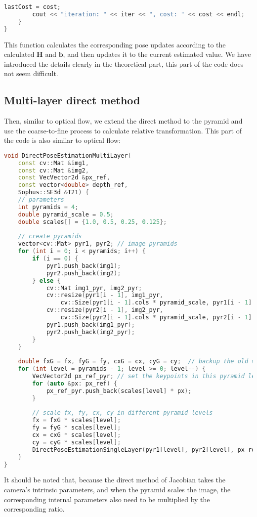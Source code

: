 {\begin{lstlisting}[language=c++,caption=slambook2/ch8/direct_method.cpp (snippet)]
		lastCost = cost;
		cout << "iteration: " << iter << ", cost: " << cost << endl;
	}
}
\end{lstlisting}
This function calculates the corresponding pose updates according to the calculated $\bm{H}$ and $\bm{b}$, and then updates it to the current estimated value. We have introduced the details clearly in the theoretical part, this part of the code does not seem difficult.

\subsection{Multi-layer direct method}
Then, similar to optical flow, we extend the direct method to the pyramid and use the coarse-to-fine process to calculate relative transformation. This part of the code is also similar to optical flow:
\begin{lstlisting}[language=c++,caption=slambook2/ch8/direct_method.cpp (snippet)]
void DirectPoseEstimationMultiLayer(
	const cv::Mat &img1,
	const cv::Mat &img2,
	const VecVector2d &px_ref,
	const vector<double> depth_ref,
	Sophus::SE3d &T21) {
	// parameters
	int pyramids = 4;
	double pyramid_scale = 0.5;
	double scales[] = {1.0, 0.5, 0.25, 0.125};
	
	// create pyramids
	vector<cv::Mat> pyr1, pyr2; // image pyramids
	for (int i = 0; i < pyramids; i++) {
		if (i == 0) {
			pyr1.push_back(img1);
			pyr2.push_back(img2);
		} else {
			cv::Mat img1_pyr, img2_pyr;
			cv::resize(pyr1[i - 1], img1_pyr,
				cv::Size(pyr1[i - 1].cols * pyramid_scale, pyr1[i - 1].rows * pyramid_scale));
			cv::resize(pyr2[i - 1], img2_pyr,
				cv::Size(pyr2[i - 1].cols * pyramid_scale, pyr2[i - 1].rows * pyramid_scale));
			pyr1.push_back(img1_pyr);
			pyr2.push_back(img2_pyr);
		}
	}
	
	double fxG = fx, fyG = fy, cxG = cx, cyG = cy;  // backup the old values
	for (int level = pyramids - 1; level >= 0; level--) {
		VecVector2d px_ref_pyr; // set the keypoints in this pyramid level
		for (auto &px: px_ref) {
			px_ref_pyr.push_back(scales[level] * px);
		}
		
		// scale fx, fy, cx, cy in different pyramid levels
		fx = fxG * scales[level];
		fy = fyG * scales[level];
		cx = cxG * scales[level];
		cy = cyG * scales[level];
		DirectPoseEstimationSingleLayer(pyr1[level], pyr2[level], px_ref_pyr, depth_ref, T21);
	}	
}
\end{lstlisting}
It should be noted that, because the direct method of Jacobian takes the camera's intrinsic parameters, and when the pyramid scales the image, the corresponding internal parameters also need to be multiplied by the corresponding ratio.

}
